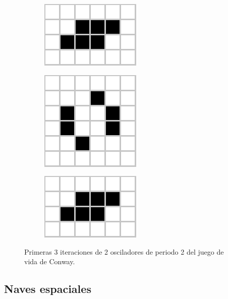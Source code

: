 \documentclass[../proyecto.tex]{memoir}
\begin{document}
\begin{figure}[H]
\begin{subfigure}[b]{0.3\linewidth}
        \includegraphics[height=0.35\linewidth]{./images/toad1.png}
        \caption{}
        \label{fig:toad1}
    \end{subfigure}
	\begin{subfigure}[b]{0.3\linewidth} 
        \centering
        \includegraphics[height=0.45\linewidth]{./images/toad2.png}
        \caption{}
        \label{fig:toad2}
    \end{subfigure}
	\begin{subfigure}[b]{0.3\linewidth} 
        \centering
        \includegraphics[height=0.35\linewidth]{./images/toad3.png}
        \caption{}
        \label{fig:toad3}
    \end{subfigure}
	\caption{Primeras 3 iteraciones de 2 osciladores de periodo 2 del juego de vida de Conway.}
	\label{fig:congIniciales3}
\end{figure} 

\subsection{Naves espaciales}
\end{document}
